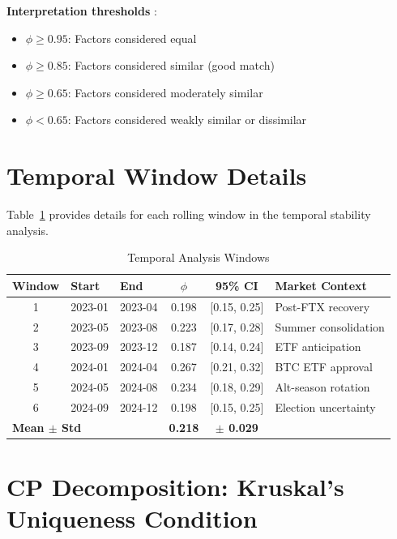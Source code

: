 \documentclass[11pt,twocolumn]{article}
\begin{document}
\textbf{Interpretation thresholds} \citep{lorenzo2006tuckers}:
\begin{itemize}
    \item $\phi \geq 0.95$: Factors considered equal
    \item $\phi \geq 0.85$: Factors considered similar (good match)
    \item $\phi \geq 0.65$: Factors considered moderately similar
    \item $\phi < 0.65$: Factors considered weakly similar or dissimilar
\end{itemize}

\section{Temporal Window Details}
\label{app:temporal}

Table~\ref{tab:temporal_windows} provides details for each rolling window in the temporal stability analysis.

\begin{table}[H]
\centering
\caption{Temporal Analysis Windows}
\label{tab:temporal_windows}
\begin{tabular}{@{}cllccl@{}}
\toprule
\textbf{Window} & \textbf{Start} & \textbf{End} & \textbf{$\phi$} & \textbf{95\% CI} & \textbf{Market Context} \\
\midrule
1 & 2023-01 & 2023-04 & 0.198 & [0.15, 0.25] & Post-FTX recovery \\
2 & 2023-05 & 2023-08 & 0.223 & [0.17, 0.28] & Summer consolidation \\
3 & 2023-09 & 2023-12 & 0.187 & [0.14, 0.24] & ETF anticipation \\
4 & 2024-01 & 2024-04 & 0.267 & [0.21, 0.32] & BTC ETF approval \\
5 & 2024-05 & 2024-08 & 0.234 & [0.18, 0.29] & Alt-season rotation \\
6 & 2024-09 & 2024-12 & 0.198 & [0.15, 0.25] & Election uncertainty \\
\midrule
\multicolumn{3}{l}{\textbf{Mean $\pm$ Std}} & \textbf{0.218} & \textbf{$\pm$ 0.029} & \\
\bottomrule
\end{tabular}
\end{table}

\section{CP Decomposition: Kruskal's Uniqueness Condition}
\label{app:kruskal}
\end{document}
